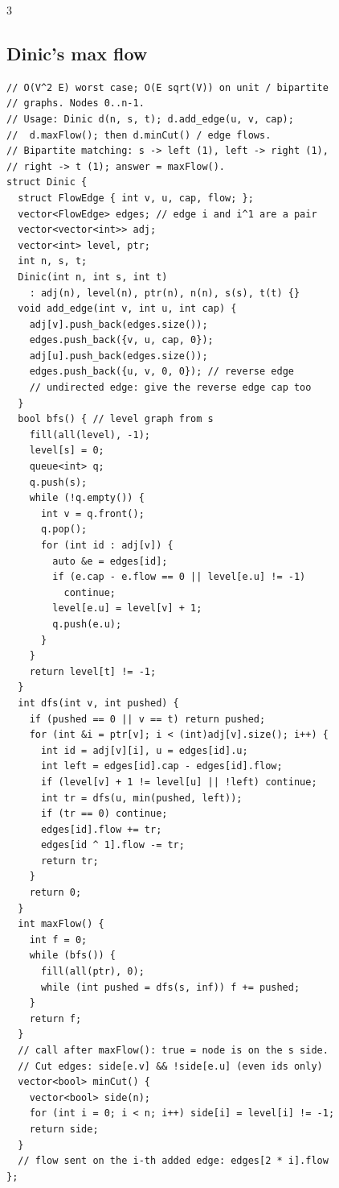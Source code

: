 \documentclass[8pt, a4paper]{article}
\begin{document}
\begin{multicols*}{3}
\subsection{Dinic's max flow}
\begin{lstlisting}
// O(V^2 E) worst case; O(E sqrt(V)) on unit / bipartite
// graphs. Nodes 0..n-1.
// Usage: Dinic d(n, s, t); d.add_edge(u, v, cap);
//  d.maxFlow(); then d.minCut() / edge flows.
// Bipartite matching: s -> left (1), left -> right (1),
// right -> t (1); answer = maxFlow().
struct Dinic {
  struct FlowEdge { int v, u, cap, flow; };
  vector<FlowEdge> edges; // edge i and i^1 are a pair
  vector<vector<int>> adj;
  vector<int> level, ptr;
  int n, s, t;
  Dinic(int n, int s, int t)
    : adj(n), level(n), ptr(n), n(n), s(s), t(t) {}
  void add_edge(int v, int u, int cap) {
    adj[v].push_back(edges.size());
    edges.push_back({v, u, cap, 0});
    adj[u].push_back(edges.size());
    edges.push_back({u, v, 0, 0}); // reverse edge
    // undirected edge: give the reverse edge cap too
  }
  bool bfs() { // level graph from s
    fill(all(level), -1);
    level[s] = 0;
    queue<int> q;
    q.push(s);
    while (!q.empty()) {
      int v = q.front();
      q.pop();
      for (int id : adj[v]) {
        auto &e = edges[id];
        if (e.cap - e.flow == 0 || level[e.u] != -1)
          continue;
        level[e.u] = level[v] + 1;
        q.push(e.u);
      }
    }
    return level[t] != -1;
  }
  int dfs(int v, int pushed) {
    if (pushed == 0 || v == t) return pushed;
    for (int &i = ptr[v]; i < (int)adj[v].size(); i++) {
      int id = adj[v][i], u = edges[id].u;
      int left = edges[id].cap - edges[id].flow;
      if (level[v] + 1 != level[u] || !left) continue;
      int tr = dfs(u, min(pushed, left));
      if (tr == 0) continue;
      edges[id].flow += tr;
      edges[id ^ 1].flow -= tr;
      return tr;
    }
    return 0;
  }
  int maxFlow() {
    int f = 0;
    while (bfs()) {
      fill(all(ptr), 0);
      while (int pushed = dfs(s, inf)) f += pushed;
    }
    return f;
  }
  // call after maxFlow(): true = node is on the s side.
  // Cut edges: side[e.v] && !side[e.u] (even ids only)
  vector<bool> minCut() {
    vector<bool> side(n);
    for (int i = 0; i < n; i++) side[i] = level[i] != -1;
    return side;
  }
  // flow sent on the i-th added edge: edges[2 * i].flow
};
\end{lstlisting}

\end{multicols*}
\end{document}

